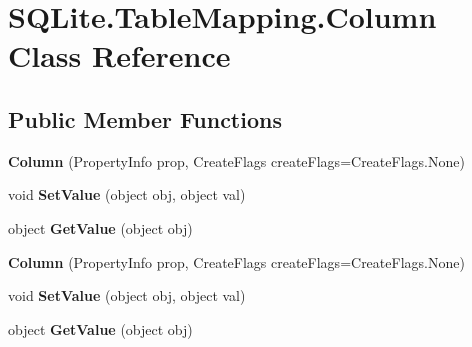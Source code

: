 \hypertarget{classSQLite_1_1TableMapping_1_1Column}{\section{S\-Q\-Lite.\-Table\-Mapping.\-Column Class Reference}
\label{classSQLite_1_1TableMapping_1_1Column}
}
\subsection*{Public Member Functions}
\begin{DoxyCompactItemize}
\item 
\hypertarget{classSQLite_1_1TableMapping_1_1Column_a404e36f92ab57bcc8f903a78dc47badf}{{\bfseries Column} (Property\-Info prop, Create\-Flags create\-Flags=Create\-Flags.\-None)}\label{classSQLite_1_1TableMapping_1_1Column_a404e36f92ab57bcc8f903a78dc47badf}

\item 
\hypertarget{classSQLite_1_1TableMapping_1_1Column_a0f57d48181580599bd9b4aa6db68687c}{void {\bfseries Set\-Value} (object obj, object val)}\label{classSQLite_1_1TableMapping_1_1Column_a0f57d48181580599bd9b4aa6db68687c}

\item 
\hypertarget{classSQLite_1_1TableMapping_1_1Column_ac2e9f8110d390d1fa630ebb0d345c293}{object {\bfseries Get\-Value} (object obj)}\label{classSQLite_1_1TableMapping_1_1Column_ac2e9f8110d390d1fa630ebb0d345c293}

\item 
\hypertarget{classSQLite_1_1TableMapping_1_1Column_a404e36f92ab57bcc8f903a78dc47badf}{{\bfseries Column} (Property\-Info prop, Create\-Flags create\-Flags=Create\-Flags.\-None)}\label{classSQLite_1_1TableMapping_1_1Column_a404e36f92ab57bcc8f903a78dc47badf}

\item 
\hypertarget{classSQLite_1_1TableMapping_1_1Column_a0f57d48181580599bd9b4aa6db68687c}{void {\bfseries Set\-Value} (object obj, object val)}\label{classSQLite_1_1TableMapping_1_1Column_a0f57d48181580599bd9b4aa6db68687c}

\item 
\hypertarget{classSQLite_1_1TableMapping_1_1Column_ac2e9f8110d390d1fa630ebb0d345c293}{object {\bfseries Get\-Value} (object obj)}\label{classSQLite_1_1TableMapping_1_1Column_ac2e9f8110d390d1fa630ebb0d345c293}

\end{DoxyCompactItemize}
